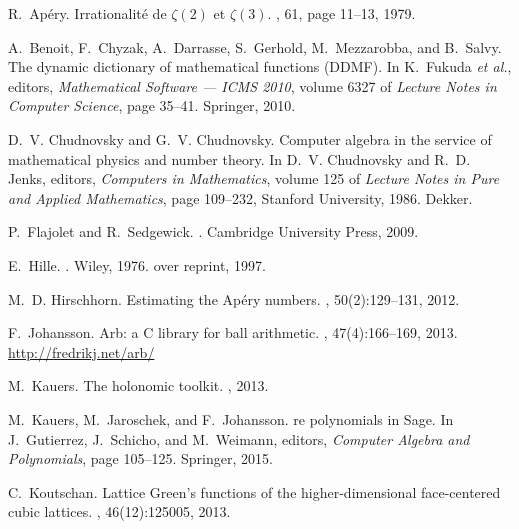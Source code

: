 \documentclass[runningheads,a4paper]{llncs}
\begin{document}
\begin{thebibliography}{10}

\enlargethispage\baselineskip

R.~Apéry.
\newblock Irrationalité de $\zeta(2)$ et $\zeta(3)$.
, 61, page 11–13, 1979.

A.~Benoit, F.~Chyzak, A.~Darrasse, S.~Gerhold, M.~Mezzarobba, and B.~Salvy.
\newblock The dynamic dictionary of mathematical functions ({DDMF}).
\newblock In K.~Fukuda \emph{et al.}, editors,
  {\em Mathematical Software — ICMS 2010}, volume 6327 of {\em Lecture Notes
  in Computer Science}, page 35–41. Springer, 2010.

D.~V. Chudnovsky and G.~V. Chudnovsky.
\newblock Computer algebra in the service of mathematical physics and number
  theory.
\newblock In D.~V. Chudnovsky and R.~D. Jenks, editors, {\em Computers in
  Mathematics}, volume 125 of {\em Lecture Notes in Pure and Applied
  Mathematics}, page 109–232, Stanford University, 1986. Dekker.

P.~Flajolet and R.~Sedgewick.
.
\newblock Cambridge University Press, 2009.

E.~Hille.
.
\newblock Wiley, 1976.
over reprint, 1997.

M.~D. Hirschhorn.
\newblock Estimating the {A}péry numbers.
, 50(2):129--131, 2012.

F.~Johansson.
\newblock Arb: a {C} library for ball arithmetic.
, 47(4):166–169, 2013.
\newblock \url{http://fredrikj.net/arb/}

M.~Kauers.
\newblock The holonomic toolkit.
, 2013.

M.~Kauers, M.~Jaroschek, and F.~Johansson.
re polynomials in {S}age.
\newblock In J.~Gutierrez, J.~Schicho, and M.~Weimann, editors, {\em Computer
  Algebra and Polynomials}, page 105–125. Springer, 2015.

C.~Koutschan.
\newblock Lattice {G}reen's functions of the higher-dimensional face-centered
  cubic lattices.
,
  46(12):125005, 2013.


\end{thebibliography}
\end{document}
